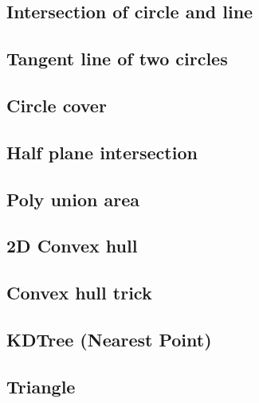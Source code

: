 \documentclass[a4paper,10pt,twocolumn,oneside]{article}
\begin{document}
\subsection{Intersection of circle and line}


\subsection{Tangent line of two circles}


\subsection{Circle cover}


\subsection{Half plane intersection}


\subsection{Poly union area}


\subsection{2D Convex hull}


\subsection{Convex hull trick}


\subsection{KDTree (Nearest Point)}


\subsection{Triangle}

\end{document}
